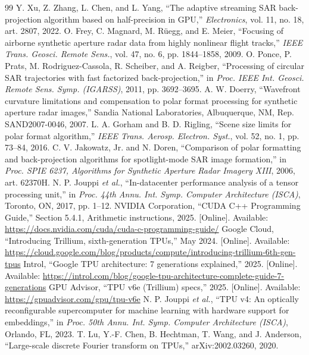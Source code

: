 \documentclass[11pt]{article}
\begin{document}
\begin{thebibliography}{99}
 Y. Xu, Z. Zhang, L. Chen, and L. Yang, ``The adaptive streaming SAR back-projection algorithm based on half-precision in GPU,'' \emph{Electronics}, vol. 11, no. 18, art. 2807, 2022.
 O. Frey, C. Magnard, M. R\"uegg, and E. Meier, ``Focusing of airborne synthetic aperture radar data from highly nonlinear flight tracks,'' \emph{IEEE Trans. Geosci. Remote Sens.}, vol. 47, no. 6, pp. 1844--1858, 2009.
 O. Ponce, P. Prats, M. Rodriguez-Cassola, R. Scheiber, and A. Reigber, ``Processing of circular SAR trajectories with fast factorized back-projection,'' in \emph{Proc. IEEE Int. Geosci. Remote Sens. Symp. (IGARSS)}, 2011, pp. 3692--3695.
 A. W. Doerry, ``Wavefront curvature limitations and compensation to polar format processing for synthetic aperture radar images,'' Sandia National Laboratories, Albuquerque, NM, Rep. SAND2007-0046, 2007.
 L. A. Gorham and B. D. Rigling, ``Scene size limits for polar format algorithm,'' \emph{IEEE Trans. Aerosp. Electron. Syst.}, vol. 52, no. 1, pp. 73--84, 2016.
 C. V. Jakowatz, Jr. and N. Doren, ``Comparison of polar formatting and back-projection algorithms for spotlight-mode SAR image formation,'' in \emph{Proc. SPIE 6237, Algorithms for Synthetic Aperture Radar Imagery XIII}, 2006, art. 62370H.
 N. P. Jouppi \emph{et al.}, ``In-datacenter performance analysis of a tensor processing unit,'' in \emph{Proc. 44th Annu. Int. Symp. Computer Architecture (ISCA)}, Toronto, ON, 2017, pp. 1--12.
 NVIDIA Corporation, ``CUDA C++ Programming Guide,'' Section 5.4.1, Arithmetic instructions, 2025. [Online]. Available: \url{https://docs.nvidia.com/cuda/cuda-c-programming-guide/}
 Google Cloud, ``Introducing Trillium, sixth-generation TPUs,'' May 2024. [Online]. Available: \url{https://cloud.google.com/blog/products/compute/introducing-trillium-6th-gen-tpus}
 Introl, ``Google TPU architecture: 7 generations explained,'' 2025. [Online]. Available: \url{https://introl.com/blog/google-tpu-architecture-complete-guide-7-generations}
 GPU Advisor, ``TPU v6e (Trillium) specs,'' 2025. [Online]. Available: \url{https://gpuadvisor.com/gpu/tpu-v6e}
 N. P. Jouppi \emph{et al.}, ``TPU v4: An optically reconfigurable supercomputer for machine learning with hardware support for embeddings,'' in \emph{Proc. 50th Annu. Int. Symp. Computer Architecture (ISCA)}, Orlando, FL, 2023.
 T. Lu, Y.-F. Chen, B. Hechtman, T. Wang, and J. Anderson, ``Large-scale discrete Fourier transform on TPUs,'' arXiv:2002.03260, 2020.

\end{thebibliography}
\end{document}
